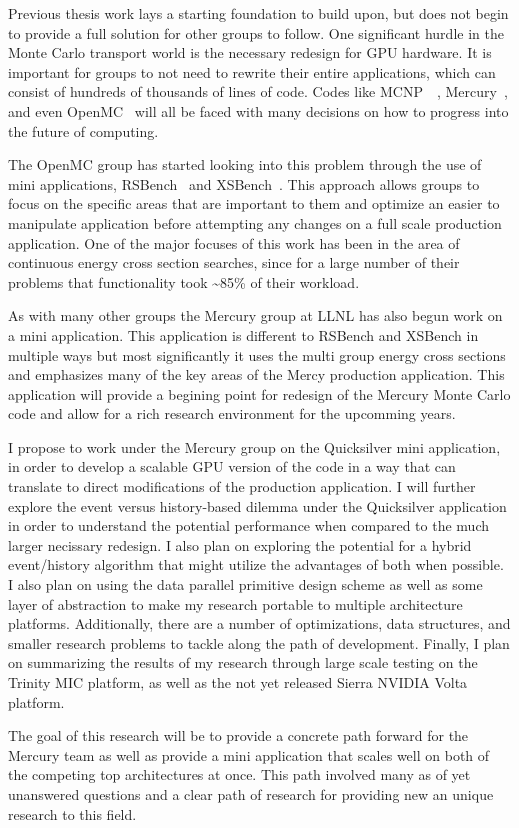 Previous thesis work lays a starting foundation to build upon, but does not begin to provide a full solution for other groups to follow.
%
One significant hurdle in the Monte Carlo transport world is the necessary redesign for GPU hardware.
%
It is important for groups to not need to rewrite their entire applications, which can consist of hundreds of thousands of lines of code.
%
Codes like MCNP~\cite{goorley2012initial}~\cite{padovani2012mcnpx}, Mercury~\cite{brantley2013recent}, and even OpenMC~\cite{romano2015openmc}
will all be faced with many decisions on how to progress into the future of computing.

The OpenMC group has started looking into this problem through the use of mini applications, RSBench~\cite{tramm2014performance} and XSBench~\cite{tramm2014xsbench}. 
%
This approach allows groups to focus on the specific areas that are important to them and optimize an easier to manipulate application before attempting any changes on a full scale production application.
%
One of the major focuses of this work has been in the area of continuous energy cross section searches, since for a large number of their problems that functionality took \textasciitilde85\% of their workload.

As with many other groups the Mercury group at LLNL has also begun work on a mini application.
%
This application is different to RSBench and XSBench in multiple ways but most significantly it uses the multi group energy cross sections and emphasizes  many of the key areas of the Mercy production application.
%
This application will provide a begining point for redesign of the Mercury Monte Carlo code and allow for a rich research environment for the upcomming years.
%

I propose to work under the Mercury group on the Quicksilver mini application, in order to develop a scalable GPU version of the code in a way that can translate to direct modifications of the production application.
%
I will further explore the event versus history-based dilemma under the Quicksilver application in order to understand the potential performance when compared to the much larger necissary redesign.
%
I also plan on exploring the potential for a hybrid event/history algorithm that might utilize the advantages of both when possible.
%
I also plan on using the data parallel primitive design scheme as well as some layer of abstraction to make my research portable to multiple architecture platforms.
%
Additionally, there are a number of optimizations, data structures, and smaller research problems to tackle along the path of development.
%
Finally, I plan on summarizing the results of my research through large scale testing on the Trinity MIC platform, as well as the not yet released Sierra NVIDIA Volta platform.

The goal of this research will be to provide a concrete path forward for the Mercury team as well as provide a mini application that scales well on both of the competing top architectures at once.
%
This path involved many as of yet unanswered questions and a clear path of research for providing new an unique research to this field.




